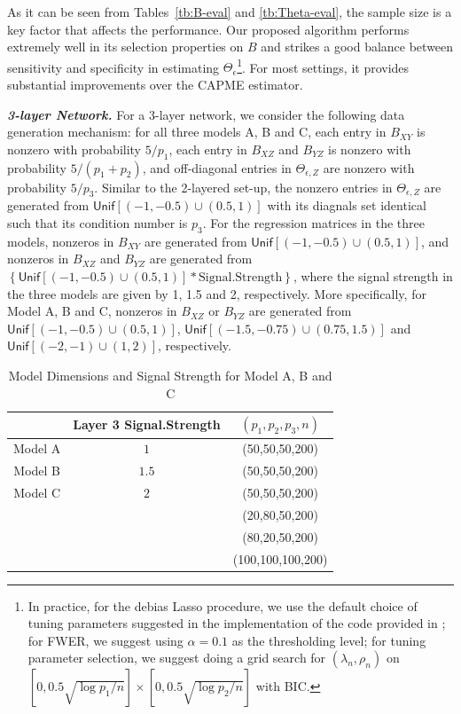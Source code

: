 As it can be seen from Tables~\ref{tb:B-eval} and \ref{tb:Theta-eval}, the sample size is a key factor that affects the performance. Our proposed algorithm performs extremely well in its selection properties on $B$ and strikes a good balance between sensitivity and specificity in estimating $\Theta_\epsilon$\footnote{In practice, for the debias Lasso procedure, we use the default choice of tuning parameters suggested in the implementation of the code provided in \citet{javanmard2014confidence}; for FWER, we suggest using $\alpha=0.1$ as the thresholding level; for tuning parameter selection, we suggest doing a grid search for $(\lambda_n,\rho_n)$ on $[0,0.5\sqrt{\log p_1/n}]\times[0,0.5\sqrt{\log p_2/n}]$ with BIC.}. For most settings, it provides substantial 
improvements over the CAPME estimator.


\medskip
\textbf{\textit{3-layer Network.}} For a 3-layer network, we consider the following data generation mechanism: for all three models A, B and C, each entry in $B_{XY}$ is nonzero with probability $5/p_1$, each entry in $B_{XZ}$ and $B_{YZ}$ is nonzero with probability $5/(p_1+p_2)$, and off-diagonal entries in $\Theta_{\epsilon,Z}$ are nonzero with probability $5/p_3$. Similar to the 2-layered set-up, the nonzero entries in $\Theta_{\epsilon,Z}$ are generated from $\mathsf{Unif}[(-1,-0.5)\cup(0.5,1)]$ with its diagnals set identical such that its condition number is $p_3$. For the regression matrices in the three models, nonzeros in $B_{XY}$ are generated from $\mathsf{Unif}[(-1,-0.5)\cup(0.5,1)]$, and nonzeros in $B_{XZ}$ and $B_{YZ}$ are generated from $\left\{\mathsf{Unif}[(-1,-0.5)\cup(0.5,1)]* \text{Signal.Strength}\right\}$, where the signal strength in the three models are given by 1, 1.5 and 2, respectively. More specifically, for Model A, B and C, nonzeros in $B_{XZ}$ or $B_{YZ}$ are generated from $\mathsf{Unif}[(-1,-0.5)\cup(0.5,1)]$, $\mathsf{Unif}[(-1.5,-0.75)\cup(0.75,1.5)]$ and $\mathsf{Unif}[(-2,-1)\cup(1,2)]$, respectively. 
\begin{table}[H]
\setlength\extrarowheight{2pt}
\centering
\caption{Model Dimensions and Signal Strength for Model A, B and C}
\begin{tabular}{ccc}
\hline
 & Layer 3 Signal.Strength & $(p_1,p_2,p_3,n)$ \\  \hline
 Model A & $1$ & (50,50,50,200) \\
 Model B &  $1.5$ & (50,50,50,200) \\
 Model C & $2$ & (50,50,50,200) \\
		 &  	& (20,80,50,200) \\
		 &  	& (80,20,50,200) \\
		 &  	& (100,100,100,200) \\
\hline
\end{tabular}
\end{table}\medskip


